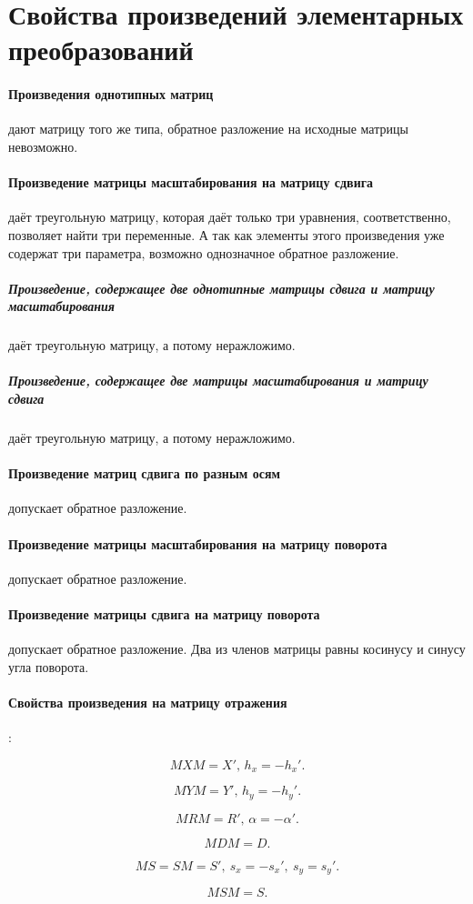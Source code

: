 \section{Свойства произведений элементарных преобразований}

\paragraph{Произведения однотипных матриц} дают матрицу того же типа, обратное разложение на исходные матрицы невозможно.

\paragraph{Произведение матрицы масштабирования на матрицу сдвига} даёт треугольную матрицу, которая даёт только три уравнения, соответственно, позволяет найти три переменные. А так как элементы этого произведения уже содержат три параметра, возможно однозначное обратное разложение.

\subparagraph{Произведение, содержащее две однотипные матрицы сдвига и матрицу масштабирования} даёт треугольную матрицу, а потому неражложимо.

\subparagraph{Произведение, содержащее две матрицы масштабирования и матрицу сдвига} даёт треугольную матрицу, а потому неражложимо.

\paragraph{Произведение матриц сдвига по разным осям} допускает обратное разложение.

\paragraph{Произведение матрицы масштабирования на матрицу поворота} допускает обратное разложение.

\paragraph{Произведение матрицы сдвига на матрицу поворота} допускает обратное разложение. Два из членов матрицы равны косинусу и синусу угла поворота.

\paragraph{Свойства произведения на матрицу отражения}:

$$MXM = X',\, h_x = -h_x'.$$

$$MYM = Y',\, h_y = -h_y'.$$

$$MRM = R',\, \alpha = -\alpha'.$$

$$MDM = D.$$

$$MS = SM = S',\ s_x = -s_x',\ s_y = s_y'.$$

$$MSM = S.$$
